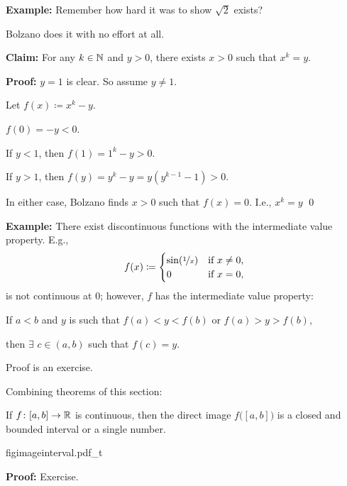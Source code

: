 \documentclass[10pt,aspectratio=169]{beamer}
\begin{document}
\begin{frame}
\textbf{Example:}
Remember how hard it was to show $\sqrt{2}$ exists?

\pause
\medskip

Bolzano does it with no effort at all.

\medskip
\pause

\textbf{Claim:}
For any $k \in {\mathbb{N}}$ and $y > 0$,
there exists $x > 0$ such that $x^k = y$.

\medskip
\pause

\textbf{Proof:}
$y=1$ is clear. \quad So assume $y\not= 1$.

\medskip
\pause

Let $f(x) \coloneqq x^k - y$.

\pause
\medskip

$f(0) = -y < 0$.

\pause
\medskip
If $y < 1$, then $f(1) = 1^k -y > 0$.

\pause

If $y > 1$,
then $f(y) = y^k-y = y(y^{k-1}-1) > 0$.

\medskip
\pause

In either case,
Bolzano finds $x > 0$ such that $f(x)=0$. \pause I.e., $x^k = y$  \qed
\end{frame}

\begin{frame}

\textbf{Example:}
There exist discontinuous functions with
the intermediate value property.
\pause
E.g.,
\begin{equation*}
f(x) \coloneqq
\begin{cases}
\sin(\nicefrac{1}{x}) & \text{if } x \not= 0, \\
0 & \text{if } x=0,
\end{cases}
\end{equation*}
is not continuous at $0$; however, $f$ has the intermediate value property:

\pause
\medskip

If $a < b$ and $y$ is such that $f(a) < y < f(b)$ or $f(a) > y > f(b)$,

then $\exists$ $c \in (a,b)$ such that $f(c) = y$.

\pause
\medskip

Proof is an exercise.
\end{frame}

\begin{frame}

Combining theorems of this section:

\begin{corollary}
If $f \colon [a,b] \to {\mathbb{R}}$ is continuous, then the direct image
$f\bigl([a,b]\bigr)$
is a closed and bounded interval or a single number.
\end{corollary}

\pause
\begin{center}
{figimageinterval.pdf_t}
\end{center}

\pause
\textbf{Proof:} Exercise.

\end{frame}
\end{document}
